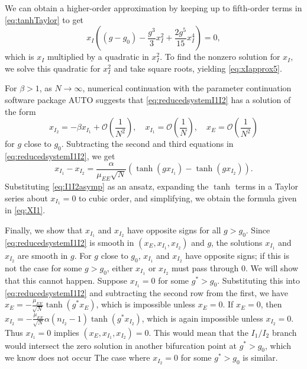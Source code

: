 \documentclass[reqno]{siamonline190516}
\begin{document}
We can obtain a higher-order approximation by keeping up to fifth-order terms in \cref{eq:tanhTaylor} to get
\begin{equation*}
x_I \left( (g - g_0) - \frac{g^3}{3} x_I^2 + \frac{2 g^5}{15} x_I^4 \right) = 0,
\end{equation*}
which is $x_I$ multiplied by a quadratic in $x_I^2$. To find the nonzero solution for $x_I$, we solve this quadratic for $x_I^2$ and take square roots, yielding \cref{eq:xIapprox5}.

For $\beta > 1$, as $N \rightarrow \infty$, numerical continuation with the parameter continuation software package AUTO \cite{AUTO} suggests that \cref{eq:reducedsystemI1I2} has a solution of the form
\begin{equation}\label{eq:I1I2asymp}
    x_{I_2} = -\beta x_{I_1} + \mathcal{O}\left( \frac{1}{N^2} \right), \quad 
    x_{I_1} = \mathcal{O}\left( \frac{1}{N} \right), \quad
     x_E = \mathcal{O}\left( \frac{1}{N^2} \right)
\end{equation}
for $g$ close to $g_0$. Subtracting the second and third equations in \cref{eq:reducedsystemI1I2}, we get
\[
 x_{I_1} - x_{I_2} = \frac{\alpha}{\mu_{EE}\sqrt{N}}\left( \tanh(g x_{I_1}) - \tanh(g x_{I_2}) \right).
 \]
Substituting \cref{eq:I1I2asymp} as an ansatz, expanding the $\tanh$ terms in a Taylor series about $x_{I_1} = 0$ to cubic order, and simplifying, we obtain the formula given in \cref{eq:XI1}.

Finally, we show that $x_{I_1}$ and $x_{I_2}$ have opposite signs for all $g > g_0$. Since \cref{eq:reducedsystemI1I2} is smooth in $(x_E, x_{I_1}, x_{I_2})$ and $g$, the solutions $x_{I_1}$ and $x_{I_2}$ are smooth in $g$. For $g$ close to $g_0$, $x_{I_1}$ and $x_{I_2}$ have opposite signs; if this is not the case for some $g > g_0$, either $x_{I_1}$ or $x_{I_2}$ must pass through 0. We will show that this cannot happen. Suppose $x_{I_1} = 0$ for some $g^* > g_0$. Substituting this into \cref{eq:reducedsystemI1I2} and subtracting the second row from the first, we have $x_E = -\frac{\mu_{EE}}{\sqrt{N}} \tanh(g^* x_E)$, which is impossible unless $x_E = 0$. If $x_E = 0$, then $x_{I_2} = -\frac{\mu_{EE}}{\sqrt{N}} \alpha(n_{I_2} - 1) \tanh(g^* x_{I_2})$, which is again impossible unless $x_{I_2} = 0$. Thus $x_{I_1}=0$ implies $(x_E, x_{I_1}, x_{I_2}) = 0$. This would mean that the $I_1/I_2$ branch would intersect the zero solution in another bifurcation point at $g^* > g_0$, which we know does not occur The case where $x_{I_2} = 0$ for some $g^* > g_0$ is similar.
\end{document}
